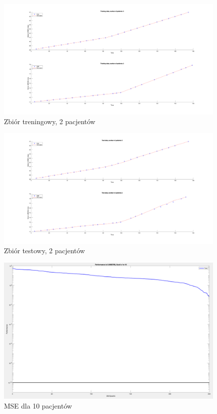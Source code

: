 \documentclass[12pt]{article}
\begin{document}
\begin{figure}[h!]

\centering
\includegraphics[width=1.05\textwidth]{training-cut-2.png}
\caption{Zbiór treningowy, 2 pacjentów}

\end{figure}

\begin{figure}[h!]

\centering
\includegraphics[width=1.0\textwidth]{test-cut-2.png}
\caption{Zbiór testowy, 2 pacjentów}

\end{figure}

\begin{figure}[h!]

\centering
\includegraphics[width=1.0\textwidth]{mse-cut-10.png}
\caption{MSE dla 10 pacjentów}

\end{figure}
\end{document}
